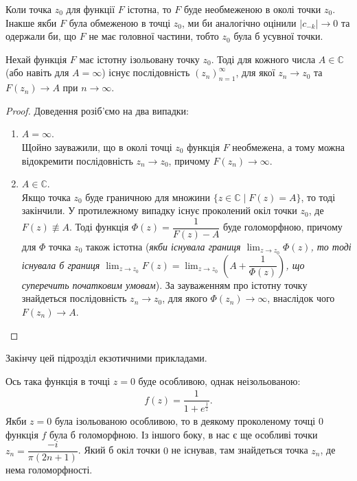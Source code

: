 \documentclass{math_library}
\begin{document}
\begin{remark}
Коли точка $z_0$ для функції $F$ істотна, то $F$ буде необмеженою в околі точки $z_0$.
\bigskip \\
Інакше якби $F$ була обмеженою в точці $z_0$, ми би аналогічно оцінили $|c_{-k}| \to 0$ та одержали би, що $F$ не має головної частини, тобто $z_0$ була б усувної точки.
\end{remark}

\begin{theorem}
Нехай функція $F$ має істотну ізольовану точку $z_0$. Тоді для кожного числа $A \in \mathbb{C}$ (або навіть для $A = \infty$) існує послідовність $(z_n)_{n=1}^\infty$, для якої $z_n \to z_0$ та $F(z_n) \to A$ при $n \to \infty$.
\end{theorem}

\begin{proof}
Доведення розіб'ємо на два випадки:
\begin{enumerate}[wide=0pt,label={\Roman*.}]
\item \textit{$A = \infty$}.\\
Щойно зауважили, що в околі точці $z_0$ функція $F$ необмежена, а тому можна відокремити послідовність $z_n \to z_0$, причому $F(z_n) \to \infty$.

\item \textit{$A \in \mathbb{C}$}.\\
Якщо точка $z_0$ буде граничною для множини $\{ z \in \mathbb{C} \mid F(z) = A \}$, то тоді закінчили. У протилежному випадку існує проколений окіл точки $z_0$, де $F(z) \not\equiv A$. Тоді функція $\Phi(z) = \dfrac{1}{F(z) - A}$ буде голоморфною, причому для $\Phi$ точка $z_0$ також істотна (\textit{якби існувала границя $\displaystyle\lim_{z \to z_0} \Phi(z)$, то тоді існувала б границя $\displaystyle\lim_{z \to z_0} F(z) = \lim_{z \to z_0} \left( A + \dfrac{1}{\Phi(z)} \right)$, що суперечить початковим умовам}). За зауваженням про істотну точку знайдеться послідовність $z_n \to z_0$, для якого $\Phi(z_n) \to \infty$, внаслідок чого $F(z_n) \to A$. \qedhere
\end{enumerate}
\end{proof}

Закінчу цей підрозділ екзотичними прикладами.

\begin{example}
Ось така функція в точці $z = 0$ буде особливою, однак неізольованою:
\begin{align*}
f(z) = \dfrac{1}{1+e^{\frac{1}{z}}}.
\end{align*}
Якби $z = 0$ була ізольованою особливою, то в деякому проколеному точці $0$ функція $f$ була б голоморфною. Із іншого боку, в нас є ще особливі точки $z_n = \dfrac{-i}{\pi (2n+1)}$. Який б окіл точки $0$ не існував, там знайдеться точка $z_n$, де нема голоморфності.
\end{example}
\end{document}
